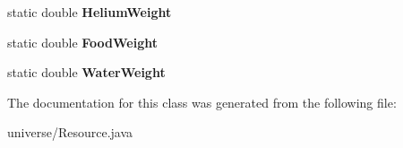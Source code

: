 \begin{DoxyCompactItemize}
\item 
static double {\bfseries Helium\+Weight}\hypertarget{classuniverse_1_1_resource_ada2fa4450ef4dd121ad7517e26340c79}{}\label{classuniverse_1_1_resource_ada2fa4450ef4dd121ad7517e26340c79}

\item 
static double {\bfseries Food\+Weight}\hypertarget{classuniverse_1_1_resource_a890d57db7904140ca71204837d09315a}{}\label{classuniverse_1_1_resource_a890d57db7904140ca71204837d09315a}

\item 
static double {\bfseries Water\+Weight}\hypertarget{classuniverse_1_1_resource_ab33b44edfc5f2b4eb9f1958da5b54609}{}\label{classuniverse_1_1_resource_ab33b44edfc5f2b4eb9f1958da5b54609}

\end{DoxyCompactItemize}


The documentation for this class was generated from the following file\+:\begin{DoxyCompactItemize}
\item 
universe/Resource.\+java\end{DoxyCompactItemize}
